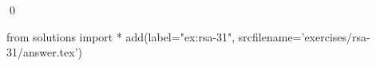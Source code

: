 
\begin{ex} 
  \label{ex:rsa-31}
  
  \qed
\end{ex} 
\begin{python0}
from solutions import *
add(label="ex:rsa-31",
    srcfilename='exercises/rsa-31/answer.tex') 
\end{python0}
